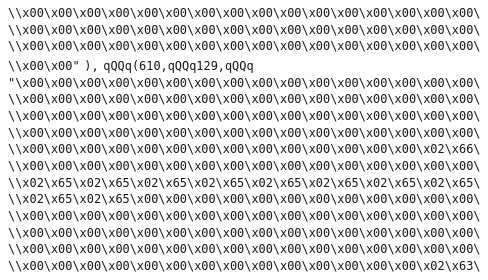 \verb|\\x00\x00\x00\x00\x00\x00\x00\x00\x00\x00\x00\x00\x00\x00\x00\x00\|\newline
\verb|\\x00\x00\x00\x00\x00\x00\x00\x00\x00\x00\x00\x00\x00\x00\x00\x00\|\newline
\verb|\\x00\x00\x00\x00\x00\x00\x00\x00\x00\x00\x00\x00\x00\x00\x00\x00\|\newline
\verb|\\x00\x00"|\newline
\verb|),|\newline
\verb|qQQq(610,qQQq129,qQQq|\newline
\verb|"\x00\x00\x00\x00\x00\x00\x00\x00\x00\x00\x00\x00\x00\x00\x00\x00\|\newline
\verb|\\x00\x00\x00\x00\x00\x00\x00\x00\x00\x00\x00\x00\x00\x00\x00\x00\|\newline
\verb|\\x00\x00\x00\x00\x00\x00\x00\x00\x00\x00\x00\x00\x00\x00\x00\x00\|\newline
\verb|\\x00\x00\x00\x00\x00\x00\x00\x00\x00\x00\x00\x00\x00\x00\x00\x00\|\newline
\verb|\\x00\x00\x00\x00\x00\x00\x00\x00\x00\x00\x00\x00\x00\x00\x02\x66\|\newline
\verb|\\x00\x00\x00\x00\x00\x00\x00\x00\x00\x00\x00\x00\x00\x00\x00\x00\|\newline
\verb|\\x02\x65\x02\x65\x02\x65\x02\x65\x02\x65\x02\x65\x02\x65\x02\x65\|\newline
\verb|\\x02\x65\x02\x65\x00\x00\x00\x00\x00\x00\x00\x00\x00\x00\x00\x00\|\newline
\verb|\\x00\x00\x00\x00\x00\x00\x00\x00\x00\x00\x00\x00\x00\x00\x00\x00\|\newline
\verb|\\x00\x00\x00\x00\x00\x00\x00\x00\x00\x00\x00\x00\x00\x00\x00\x00\|\newline
\verb|\\x00\x00\x00\x00\x00\x00\x00\x00\x00\x00\x00\x00\x00\x00\x00\x00\|\newline
\verb|\\x00\x00\x00\x00\x00\x00\x00\x00\x00\x00\x00\x00\x00\x00\x02\x63\|\newline
